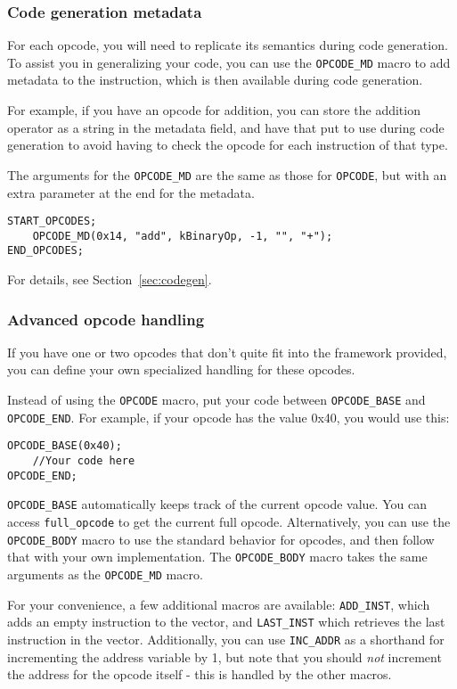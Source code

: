 \subsubsection{Code generation metadata}
For each opcode, you will need to replicate its semantics during code generation. To assist you in generalizing your code, you can use the \verb+OPCODE_MD+ macro to add metadata to the instruction, which is then available during code generation.

For example, if you have an opcode for addition, you can store the addition operator as a string in the metadata field, and have that put to use during code generation to avoid having to check the opcode for each instruction of that type.

The arguments for the \verb+OPCODE_MD+ are the same as those for \verb+OPCODE+, but with an extra parameter at the end for the metadata.

\begin{C++}
\begin{lstlisting}
START_OPCODES;
	OPCODE_MD(0x14, "add", kBinaryOp, -1, "", "+");
END_OPCODES;
\end{lstlisting}
\end{C++}

For details, see Section~\vref{sec:codegen}.

\subsubsection{Advanced opcode handling}
If you have one or two opcodes that don't quite fit into the framework provided, you can define your own specialized handling for these opcodes.

Instead of using the \verb+OPCODE+ macro, put your code between \verb+OPCODE_BASE+ and \verb+OPCODE_END+. For example, if your opcode has the value 0x40, you would use this:

\begin{C++}
\begin{lstlisting}
OPCODE_BASE(0x40);
	//Your code here
OPCODE_END;
\end{lstlisting}
\end{C++}

\verb+OPCODE_BASE+ automatically keeps track of the current opcode value. You can access \verb+full_opcode+ to get the current full opcode. Alternatively, you can use the \verb+OPCODE_BODY+ macro to use the standard behavior for opcodes, and then follow that with your own implementation. The \verb+OPCODE_BODY+ macro takes the same arguments as the \verb+OPCODE_MD+ macro.

For your convenience, a few additional macros are available: \verb+ADD_INST+, which adds an empty instruction to the vector, and \verb+LAST_INST+ which retrieves the last instruction in the vector. Additionally, you can use \verb+INC_ADDR+ as a shorthand for incrementing the address variable by 1, but note that you should \emph{not} increment the address for the opcode itself - this is handled by the other macros.
